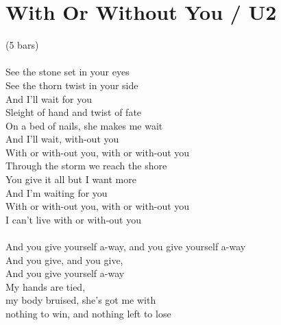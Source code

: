 \section{With Or Without You / U2}\label{sec:withorwithoutyou}
  
\Amajor
\Bminor
\DmajorEasy
\Gmajor
  
 (5 bars)   \\
     \\
  See the  stone set in your  eyes\\
See the  thorn twist in your  side\\
And I'll  wait for  you \\
  Sleight of  hand and twist of  fate\\
On a bed of  nails, she makes me  wait\\
And I'll  wait, with-out you \\
With or with-out  you, with or with-out you \\
 Through the  storm we reach the  shore\\
You give it  all but I want  more\\
And I'm  waiting  for you \\
With or with-out you,  with or with-out you  \\
I can't  live  with or with-out you \\
            \\
And you  give yourself a-way, and you  give yourself a-way\\
And you  give, and you  give,\\
And you  give yourself a-way\\
 My hands are  tied,\\
  my body  bruised, she's got me  with\\
nothing to  win, and  nothing left to  lose\\
